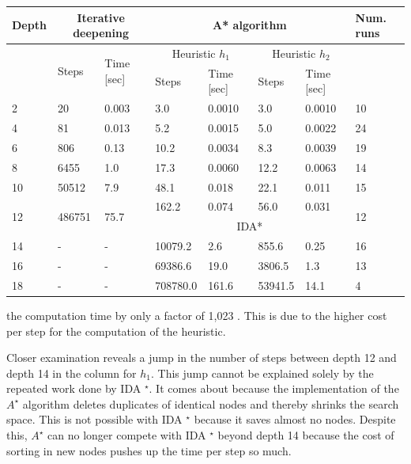 \documentclass[10pt]{book}
\begin{document}
\begin{center}
\begin{tabular}{|l|l|l|l|l|l|l|l|}
\hline
\multirow[t]{3}{*}{Depth} & \multicolumn{2}{|c|}{Iterative deepening} & \multicolumn{4}{|c|}{A* algorithm} & \multirow[t]{3}{*}{Num. runs} \\
\hline
 & \multirow[t]{2}{*}{Steps} & \multirow{2}{*}{Time [sec]} & \multicolumn{2}{|c|}{Heuristic $h_{1}$} & \multicolumn{2}{|c|}{Heuristic $h_{2}$} &  \\
\hline
 &  &  & Steps & Time [sec] & Steps & Time [sec] &  \\
\hline
2 & 20 & 0.003 & 3.0 & 0.0010 & 3.0 & 0.0010 & 10 \\
\hline
4 & 81 & 0.013 & 5.2 & 0.0015 & 5.0 & 0.0022 & 24 \\
\hline
6 & 806 & 0.13 & 10.2 & 0.0034 & 8.3 & 0.0039 & 19 \\
\hline
8 & 6455 & 1.0 & 17.3 & 0.0060 & 12.2 & 0.0063 & 14 \\
\hline
10 & 50512 & 7.9 & 48.1 & 0.018 & 22.1 & 0.011 & 15 \\
\hline
\multirow[t]{2}{*}{12} & \multirow[t]{2}{*}{486751} & \multirow[t]{2}{*}{75.7} & 162.2 & 0.074 & 56.0 & 0.031 & \multirow[t]{2}{*}{12} \\
\hline
 &  &  & \multicolumn{4}{|c|}{IDA*} &  \\
\hline
14 & - & - & 10079.2 & 2.6 & 855.6 & 0.25 & 16 \\
\hline
16 & - & - & 69386.6 & 19.0 & 3806.5 & 1.3 & 13 \\
\hline
18 & - & - & 708780.0 & 161.6 & 53941.5 & 14.1 & 4 \\
\hline
\end{tabular}
\end{center}

the computation time by only a factor of 1,023 . This is due to the higher cost per step for the computation of the heuristic.


Closer examination reveals a jump in the number of steps between depth 12 and depth 14 in the column for $h_{1}$. This jump cannot be explained solely by the repeated work done by IDA ${ }^{\star}$. It comes about because the implementation of the $A^{\star}$ algorithm deletes duplicates of identical nodes and thereby shrinks the search space. This is not possible with IDA ${ }^{\star}$ because it saves almost no nodes. Despite this, $A^{\star}$ can no longer compete with IDA ${ }^{\star}$ beyond depth 14 because the cost of sorting in new nodes pushes up the time per step so much.
\end{document}
